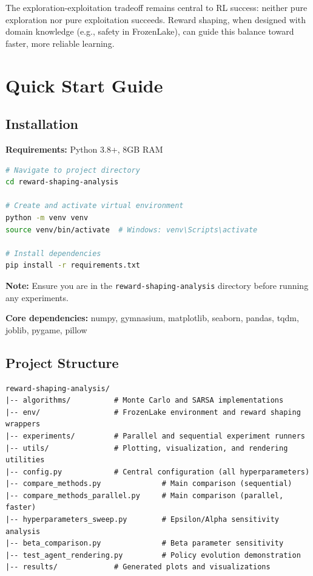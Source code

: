 \documentclass[11pt,a4paper]{article}
\begin{document}
The exploration-exploitation tradeoff remains central to RL success: neither pure exploration nor pure exploitation succeeds. Reward shaping, when designed with domain knowledge (e.g., safety in FrozenLake), can guide this balance toward faster, more reliable learning.

\section*{Quick Start Guide}

\subsection*{Installation}

\textbf{Requirements:} Python 3.8+, 8GB RAM

\begin{lstlisting}[language=bash]
# Navigate to project directory
cd reward-shaping-analysis

# Create and activate virtual environment
python -m venv venv
source venv/bin/activate  # Windows: venv\Scripts\activate

# Install dependencies
pip install -r requirements.txt
\end{lstlisting}

\textbf{Note:} Ensure you are in the \texttt{reward-shaping-analysis} directory before running any experiments.

\textbf{Core dependencies:} numpy, gymnasium, matplotlib, seaborn, pandas, tqdm, joblib, pygame, pillow

\subsection*{Project Structure}

\begin{lstlisting}
reward-shaping-analysis/
|-- algorithms/          # Monte Carlo and SARSA implementations
|-- env/                 # FrozenLake environment and reward shaping wrappers
|-- experiments/         # Parallel and sequential experiment runners
|-- utils/               # Plotting, visualization, and rendering utilities
|-- config.py            # Central configuration (all hyperparameters)
|-- compare_methods.py              # Main comparison (sequential)
|-- compare_methods_parallel.py     # Main comparison (parallel, faster)
|-- hyperparameters_sweep.py        # Epsilon/Alpha sensitivity analysis
|-- beta_comparison.py              # Beta parameter sensitivity
|-- test_agent_rendering.py         # Policy evolution demonstration
|-- results/             # Generated plots and visualizations
\end{lstlisting}
\end{document}
